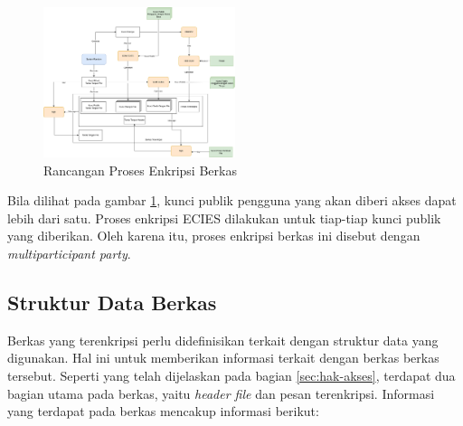 \documentclass[conference]{IEEEtran}
\begin{document}
\begin{figure}[htbp]
    \centerline{\includegraphics[width=0.5\textwidth]{res/scheme.png}}
    \caption{Rancangan Proses Enkripsi Berkas}
    \label{fig:enkripsi}
\end{figure}

Bila dilihat pada gambar \ref{fig:enkripsi}, kunci publik pengguna yang akan diberi akses dapat lebih dari satu. Proses enkripsi ECIES dilakukan untuk tiap-tiap kunci publik yang diberikan. Oleh karena itu, proses enkripsi berkas ini disebut dengan \emph{multiparticipant party}.

\subsection{Struktur Data Berkas}

Berkas yang terenkripsi perlu didefinisikan terkait dengan struktur data yang digunakan. Hal ini untuk memberikan informasi terkait dengan berkas berkas tersebut. Seperti yang telah dijelaskan pada bagian \ref{sec:hak-akses}, terdapat dua bagian utama pada berkas, yaitu \emph{header file} dan pesan terenkripsi. Informasi yang terdapat pada berkas mencakup informasi berikut:
\end{document}

